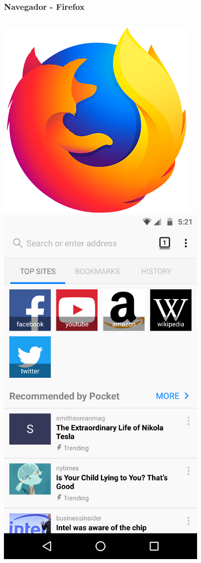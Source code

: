 \begin{frame}

    \frametitle{Navegador - Firefox}

    \begin{columns}[c]
            \begin{center}
                \includegraphics[height=0.15\textheight]{images/firefox.png}
                \includegraphics[height=0.5\textheight]{images/firefox-screencap.png}

\end{center}
\end{columns}
\end{frame}
